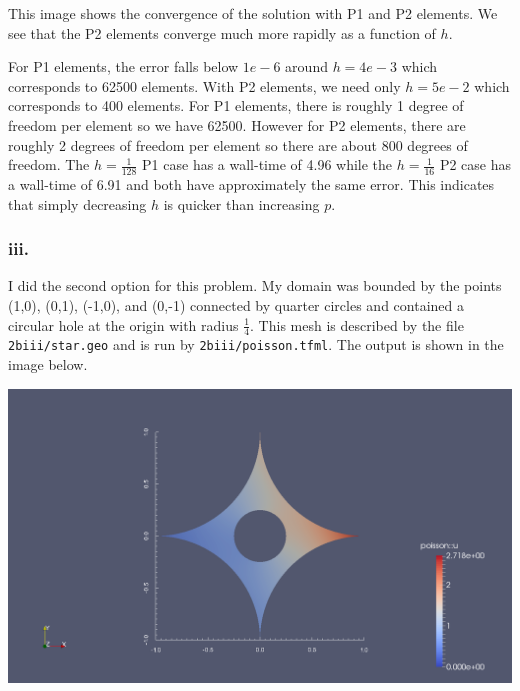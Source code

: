 \documentclass{article}
\begin{document}
This image shows the convergence of the solution with P1 and P2 elements. We see that the P2 elements converge much more rapidly as a function of $h$.

For P1 elements, the error falls below $1e-6$ around $h=4e-3$ which corresponds to 62500 elements. With P2 elements, we need only $h=5e-2$ which corresponds to 400 elements. For P1 elements, there is roughly 1 degree of freedom per element so we have 62500. However for P2 elements, there are roughly 2 degrees of freedom per element so there are about 800 degrees of freedom. The $h=\frac{1}{128}$ P1 case has a wall-time of 4.96 while the $h=\frac{1}{16}$ P2 case has a wall-time of 6.91 and both have approximately the same error. This indicates that simply decreasing $h$ is quicker than increasing $p$.

\subsubsection*{iii.}

I did the second option for this problem. My domain was bounded by the points (1,0), (0,1), (-1,0), and (0,-1) connected by quarter circles and contained a circular hole at the origin with radius $\frac{1}{4}$. This mesh is described by the file \verb|2biii/star.geo| and is run by \verb|2biii/poisson.tfml|. The output is shown in the image below.

\includegraphics[width=\linewidth]{2biii.png}
\end{document}
